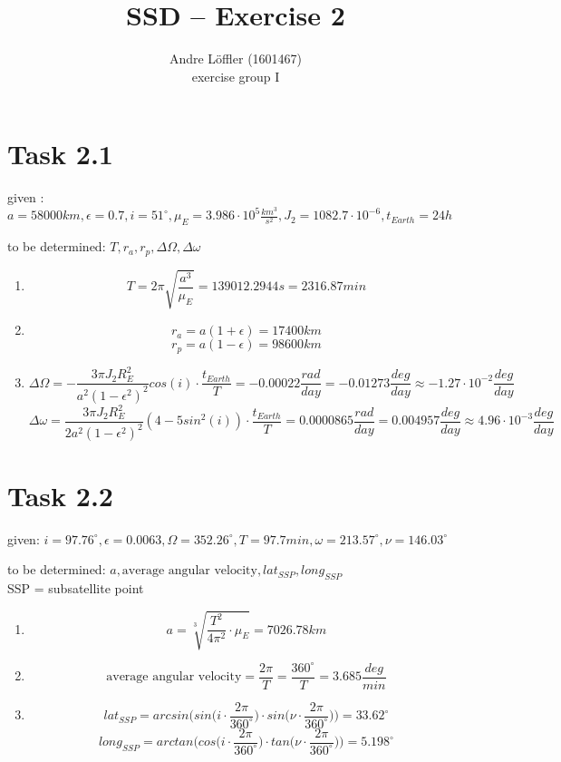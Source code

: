 \documentclass[a4paper,12pt]{article}
\title{SSD -- Exercise 2}
\author{Andre Löffler (1601467) \\ exercise group I}
\date{}
\begin{document}
\maketitle

\section*{Task 2.1}

given : $a = 58000km,\epsilon = 0.7, i = 51^{\circ}, \mu_E = 3.986\cdot 10^5 \frac{km^3}{s^2}, J_2 = 1082.7 \cdot 10^{-6}, t_{Earth} = 24h$

\noindent to be determined: $T, r_a, r_p, \Delta\Omega, \Delta\omega$
\begin{enumerate}
 \item \[ T = 2\pi\sqrt{\frac{a^3}{\mu_E}} = 139012.2944s = 2316.87 min\]
 \item \[ r_a = a(1+\epsilon) = 17400km\]
 \[r_p = a(1-\epsilon) = 98600km\]
 \item \[\Delta\Omega = - \frac{3\pi J_2R_E^2}{a^2(1-\epsilon^2)^2}cos(i)\cdot \frac{t_{Earth}}{T} = -0.00022 \frac{rad}{day} = -0.01273 \frac{deg}{day} \approx -1.27 \cdot 10^{-2} \frac{deg}{day}\]
 \[\Delta\omega = \frac{3\pi J_2R_E^2}{2a^2(1-\epsilon^2)^2}(4-5sin^2(i))\cdot \frac{t_{Earth}}{T} = 0.0000865 \frac{rad}{day} = 0.004957 \frac{deg}{day} \approx 4.96\cdot 10^{-3} \frac{deg}{day}\]
\end{enumerate}


\section*{Task 2.2}
given: $i = 97.76^{\circ}, \epsilon = 0.0063, \Omega = 352.26^{\circ}, T = 97.7min, \omega = 213.57^{\circ}, \nu = 146.03^{\circ}$

\noindent to be determined: $a, \text{average angular velocity}, lat_{SSP}, long_{SSP}$
\\SSP = subsatellite point
\begin{enumerate}
 \item \[ a = \sqrt[3]{\frac{T^2}{4\pi^2}\cdot \mu_E} = 7026.78 km\]
 \item \[ \text{average angular velocity} = \frac{2\pi}{T} = \frac{360^{\circ}}{T} = 3.685 \frac{deg}{min}\]
 \item \[ lat_{SSP} = arcsin\bigg(sin\bigg(i\cdot \frac{2\pi}{360^{\circ}}\bigg)\cdot sin\bigg(\nu\cdot\frac{2\pi}{360^{\circ}}\bigg)\bigg) = 33.62^{\circ} \]
 \[long_{SSP} = arctan\bigg( cos\bigg(i\cdot \frac{2\pi}{360^{\circ}}\bigg)\cdot tan\bigg(\nu\cdot \frac{2\pi}{360^{\circ}} \bigg) \bigg) = 5.198^{\circ}\]
\end{enumerate}
\end{document}
